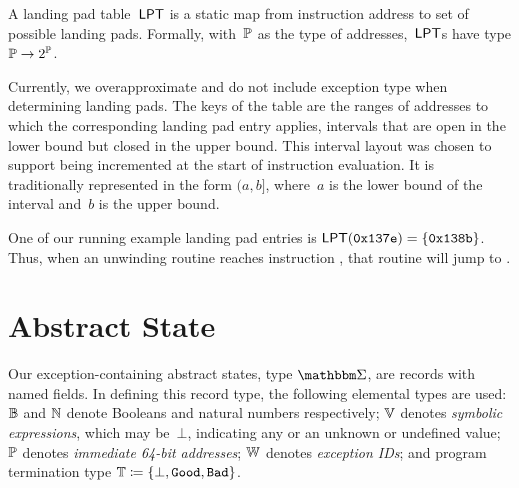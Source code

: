 \begin{definition}
  A landing pad table~$\operatorname{\mathsf{LPT}}$ is a static map from instruction address to set of possible landing pads.
  Formally, with~$\mathbb P$ as the type of addresses,~$\operatorname{\mathsf{LPT}}$s have type $\mathbb P\to2^\mathbb P$.
\end{definition}
Currently, we overapproximate and do not include exception type when determining landing pads.
The keys of the table are the ranges of addresses to which the corresponding landing pad entry applies, intervals that are open in the lower bound but closed in the upper bound. This interval layout was chosen to support  being incremented at the start of instruction evaluation. It is traditionally represented in the form $(a,b]$, where~$a$ is the lower bound of the interval and~$b$ is the upper bound.
\begin{example}\label{ex:landing-pad-table}
  One of our running example landing pad entries is  $\operatorname{\mathsf{LPT}}(\mathtt{0x137e})=\{\mathtt{0x138b}\}$.
  Thus, when an unwinding routine reaches instruction , %
  that routine will jump to .
\end{example}

\section{Abstract State}\label{sec:abstract-state}
Our exception-containing abstract states, type $\absState$, are records with named fields.
In defining this record type, the following elemental types are used:
$\mathbb B$ and $\mathbb N$ denote Booleans and natural numbers respectively;
$\mathbb V$ denotes \emph{symbolic expressions}, which may be~$\bot$, indicating any or an unknown or undefined value;
$\mathbb P$ denotes \emph{immediate 64-bit addresses};
$\mathbb W$ denotes \emph{exception IDs}; and
program termination type $\mathbb T\coloneqq\{\bot,\mathtt{Good},\mathtt{Bad}\}$.

